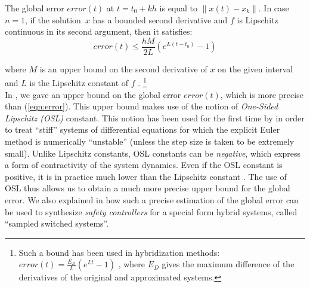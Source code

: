 The global error $error(t)$ at $t=t_0+kh$ is equal to
$\|x(t) -x_{k}\|$.  In case $n=1$, if the solution~$x$  has a bounded second derivative and $f$ is Lipschitz continuous in its second argument, then it
 satisfies:
\begin{equation}\label{eqn:error}
    error(t) \leq {\frac {hM}{2L}}(e^{L(t-t_{0})}-1)
  \end{equation}

where $M$ is an upper bound on the second derivative of $x$ on the given interval and $L$
is the Lipschitz constant of $f$ \cite{atkinson2008introduction}.
\footnote{Such a bound has been used in hybridization methods:
$error(t)=\frac{E_D}{L}(e^{Lt}-1)$ \cite{asarin2007hybridization,chen2016decomposed},
where $E_D$ gives the maximum difference of the derivatives of the original and approximated systems.}\\


In \cite{SNR17}, we gave an upper bound on the global error $error(t)$,
which is more precise than (\ref{eqn:error}).
%
This upper bound makes use of the notion of
{\em One-Sided Lipschitz (OSL)} constant. This notion has been used for the first
time by
\cite{donchev1998stability}
in order to treat ``stiff'' systems of differential equations for which the explicit Euler method is
numerically ``unstable'' (unless the step size is taken to be extremely small).
%
Unlike Lipschitz constants, OSL constants can be {\em negative},
which express a form of contractivity of the system dynamics.
Even if the OSL constant is positive, it is in practice much lower than
the Lipschitz constant \cite{dahlquist1976error}. The use of OSL thus allows us to obtain a much
more precise upper bound for the global error.
%
We also explained in \cite{SNR17} how such a precise estimation of the
global error can be used to synthesize {\em safety controllers} for a special
form hybrid systems, called ``sampled switched systems''.\\

